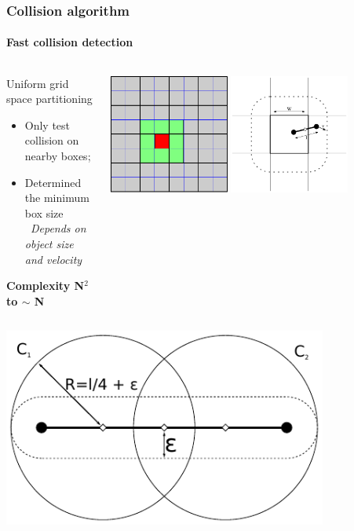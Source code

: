 \documentclass[aspectratio=1610,t,10pt]{beamer}
\begin{document}
\begin{frame}
\frametitle{Collision algorithm}
\framesubtitle{Fast collision detection}
\vspace{1em}
\begin{columns}[c]
	\begin{column}{.48\textwidth}
		\begin{block}{Uniform grid space partitioning}
			\begin{itemize}
				\item Only test collision on nearby boxes;
				\item Determined the minimum box size \\ \textit{~\footnotesize Depends on object size and velocity}
			\end{itemize}
			\centering
			\textbf{Complexity N$^2$ to $\sim$ N}								
		\end{block}
	\end{column}
	\begin{column}{.48\textwidth}
		\centering
		\includegraphics[width=0.4\textwidth]{img/uniform_grid}
		\includegraphics[width=0.4\textwidth]{img/minimum_box_size}		
	\end{column}
\end{columns}
\vspace{1ex}
\begin{columns}[c]
	\begin{column}{.48\textwidth}
		\centering
		\includegraphics[width=0.8\textwidth]{img/bounding_spheres}

\end{column}
\end{columns}
\end{frame}
\end{document}

